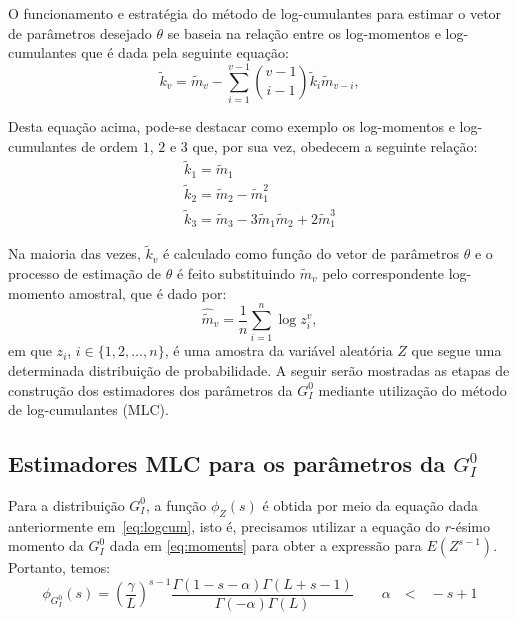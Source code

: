 O funcionamento e estratégia do método de log-cumulantes para estimar o vetor de parâmetros desejado $\theta$ se baseia na relação entre os log-momentos e log-cumulantes que é dada pela seguinte equação:
\begin{equation}
    \widetilde{k}_{v} = \widetilde{m}_{v} - \sum_{i=1}^{v-1}\binom{v-1}{i-1}\widetilde{k}_{i}\widetilde{m}_{v-i},
\end{equation}

Desta equação acima, pode-se destacar como exemplo os log-momentos e log-cumulantes de ordem $1$, $2$ e $3$ que, por sua vez, obedecem a seguinte relação:
\begin{equation}
    \begin{matrix}
        \widetilde{k}_{1} = \widetilde{m}_{1} \\ 
        \widetilde{k}_{2} = \widetilde{m}_{2} - \widetilde{m}_{1}^{2} \\
        \widetilde{k}_{3} = \widetilde{m}_{3} - 3\widetilde{m}_{1}\widetilde{m}_{2} + 2\widetilde{m}_{1}^{3} 
    \end{matrix}  
    \label{eq:logcum123}
\end{equation}

Na maioria das vezes, $\widetilde{k}_{v}$ é calculado como função do vetor de parâmetros $\theta$ e o processo de estimação de $\theta$ é feito substituindo $\widetilde{m}_{v}$ pelo correspondente log-momento amostral, que é dado por:
\begin{equation}
    \widehat{\widetilde{m}}_{v} = \frac{1}{n}\sum_{i=1}^{n}\log z_{i}^{v},
    \label{eq:log_momAmostrais}
\end{equation}
em que $z_i$, $i \in \{1, 2, \dots, n\}$, é uma amostra da variável aleatória $Z$ que segue uma determinada distribuição de probabilidade. A seguir serão mostradas as etapas de construção dos estimadores dos parâmetros da $G_I^0$ mediante utilização do método de log-cumulantes (MLC). 

\subsection{Estimadores MLC para os parâmetros da $G_I^0$}

Para a distribuição $G_I^0$, a função $\phi_{Z}(s)$ é obtida por meio da equação dada anteriormente em~\eqref{eq:logcum}, isto é, precisamos utilizar a equação do $r$-ésimo momento da $G_I^0$ dada em \eqref{eq:moments} para obter a expressão para $E(Z^{s-1})$. Portanto, temos:
\begin{equation}
    \phi_{G_I^0}(s) = \left ( \frac{\gamma}{L} \right )^{s-1}\frac{\Gamma(1-s-\alpha)\Gamma(L+s-1)}{\Gamma(-\alpha)\Gamma(L)}  \qquad \alpha \quad \text{<} \quad -s+1
\end{equation}

